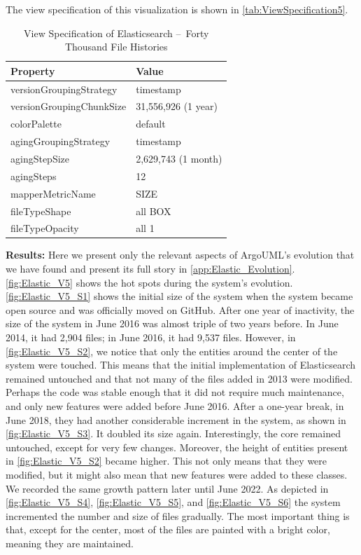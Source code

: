The view specification of this visualization is shown in \autoref{tab:ViewSpecification5}.
\begin{table}[h]
	\small
    \centering
    \begin{tabular}{@{}ll@{}} 
        \toprule
        \textbf{Property} & \textbf{Value} \\\midrule
        versionGroupingStrategy & timestamp\\ 
		versionGroupingChunkSize & 31,556,926 (1 year)\\
		colorPalette & default\\
		agingGroupingStrategy & timestamp \\
		agingStepSize & 2,629,743 (1 month) \\
		agingSteps & 12 \\
		mapperMetricName & SIZE \\
		fileTypeShape & all BOX \\
		fileTypeOpacity & all 1 \\\bottomrule
    \end{tabular}
        \caption{View Specification of Elasticsearch – Forty Thousand File Histories}
    \label{tab:ViewSpecification5}
\end{table}

\bigbreak
\noindent
\textbf{Results:}
Here we present only the relevant aspects of ArgoUML's evolution that we have found and present its full story in \autoref{app:Elastic_Evolution}. \autoref{fig:Elastic_V5} shows the hot spots during the system's evolution. \autoref{fig:Elastic_V5_S1} shows the initial size of the system when the system became open source and was officially moved on GitHub. After one year of inactivity, the size of the system in June 2016 was almost triple of two years before. In June 2014, it had 2,904 files; in June 2016, it had 9,537 files. However, in \autoref{fig:Elastic_V5_S2}, we notice that only the entities around the center of the system were touched. This means that the initial implementation of Elasticsearch remained untouched and that not many of the files added in 2013 were modified. Perhaps the code was stable enough that it did not require much maintenance, and only new features were added before June 2016. After a one-year break, in June 2018, they had another considerable increment in the system, as shown in \autoref{fig:Elastic_V5_S3}. It doubled its size again. Interestingly, the core remained untouched, except for very few changes. Moreover, the height of entities present in \autoref{fig:Elastic_V5_S2} became higher. This not only means that they were modified, but it might also mean that new features were added to these classes. We recorded the same growth pattern later until June 2022. As depicted in \autoref{fig:Elastic_V5_S4}, \autoref{fig:Elastic_V5_S5}, and \autoref{fig:Elastic_V5_S6} the system incremented the number and size of files gradually. The most important thing is that, except for the center, most of the files are painted with a bright color, meaning they are maintained. 


